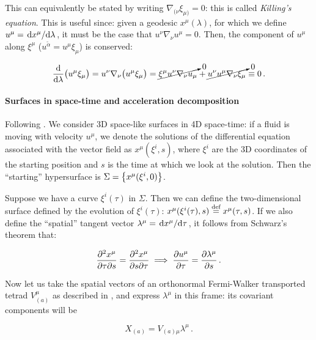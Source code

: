 \documentclass[main.tex]{subfiles}
\begin{document}
This can equivalently be stated by writing \(\nabla_{(\nu} \xi_{\mu)}=0\): this is called \emph{Killing's equation}. This is useful since: given a geodesic \(x^\mu(\lambda)\), for which we define \(u^\mu = \dv*{x^\mu}{\lambda} \), it must be the case that \(u^\nu \nabla_\nu u^\mu = 0 \). Then, the component of \(u^\mu\) along \(\xi^\mu\) (\(u^{\widetilde{\alpha}} = u^\mu \xi_\mu\)) is conserved:

\begin{equation}
    \dv{}{\lambda} \qty(u^\mu \xi_\mu) = u^\nu \nabla_\nu \qty(u^\mu \xi_\mu)
    = \cancelto{0}{\xi^\mu u^\nu \nabla_\nu u_\mu} + \cancelto{0}{u^\nu u^\mu \nabla_\nu \xi_\mu} \equiv 0 \,.
\end{equation}

\paragraph{Surfaces in space-time and acceleration decomposition}

Following \cite[section 4]{Taub:1978}.
We consider 3D space-like surfaces in 4D space-time: if a fluid is moving with velocity \(u^\mu\), we denote the solutions of the differential equation associated with the vector field as \(x^\mu (\xi^i, s)\), where \(\xi^i\) are the 3D coordinates of the starting position and \(s\) is the time at which we look at the solution. Then the ``starting'' hypersurface is \(\Sigma = \qty{x^\mu (\xi^i, 0)}\).

Suppose we have a curve \(\xi^i(\tau)\) in \(\Sigma\). Then we can define the two-dimensional surface defined by the evolution of \(\xi^i(\tau)\): \(x^{\mu} (\xi^i(\tau), s) \stackrel{\text{def}}{=} x^\mu (\tau, s)\).
If we also define the ``spatial'' tangent vector \(\lambda^\mu = \dv*{x^\mu}{\tau} \), it follows from Schwarz's theorem that:

\begin{equation} \label{eq:schwarz-spacetime-tube}
    \pdv{x^\mu}{\tau}{s} =
    \pdv{x^\mu}{s}{\tau}
    \implies
    \pdv{u^\mu}{\tau} = \pdv{\lambda^\mu}{s} \,.
\end{equation}

Now let us take the spatial vectors of an orthonormal Fermi-Walker transported tetrad \(V^\mu_{(a)}\) as described in , and express \(\lambda^\mu\) in this frame: its covariant components will be

\begin{equation} \label{eq:tetrad-components-lambda}
    X_{(a)} = V_{(a)\mu} \lambda^\mu \,.
\end{equation}
\end{document}
